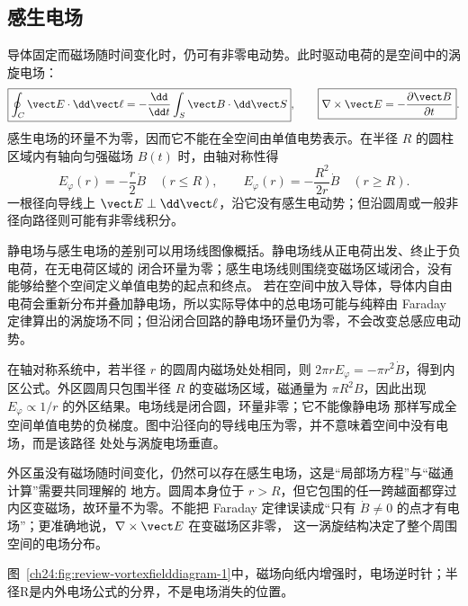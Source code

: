 \subsection{感生电场}

导体固定而磁场随时间变化时，仍可有非零电动势。此时驱动电荷的是空间中的涡旋电场：
\begin{equation}
  \boxed{\oint_C\vect E\cdot\dd\vect\ell
  =-\frac{\dd}{\dd t}\int_S\vect B\cdot\dd\vect S},
  \qquad
  \boxed{\nabla\times\vect E=-\frac{\partial\vect B}{\partial t}}.
\end{equation}
感生电场的环量不为零，因而它不能在全空间由单值电势表示。在半径 $R$ 的圆柱区域内有轴向匀强磁场
$B(t)$ 时，由轴对称性得
\begin{equation}
  \boxed{E_\varphi(r)=-\frac r2\dot B\quad(r\le R)},
  \qquad
  \boxed{E_\varphi(r)=-\frac{R^2}{2r}\dot B\quad(r\ge R)}.
\end{equation}
一根径向导线上 $\vect E\perp\dd\vect\ell$，沿它没有感生电动势；但沿圆周或一般非径向路径则可能有非零线积分。

静电场与感生电场的差别可以用场线图像概括。静电场线从正电荷出发、终止于负电荷，在无电荷区域的
闭合环量为零；感生电场线则围绕变磁场区域闭合，没有能够给整个空间定义单值电势的起点和终点。
若在空间中放入导体，导体内自由电荷会重新分布并叠加静电场，所以实际导体中的总电场可能与纯粹由
Faraday 定律算出的涡旋场不同；但沿闭合回路的静电场环量仍为零，不会改变总感应电动势。

在轴对称系统中，若半径 $r$ 的圆周内磁场处处相同，则
$2\pi rE_\varphi=-\pi r^2\dot B$，得到内区公式。外区圆周只包围半径 $R$ 的变磁场区域，磁通量为
$\pi R^2B$，因此出现 $E_\varphi\propto1/r$ 的外区结果。电场线是闭合圆，环量非零；它不能像静电场
那样写成全空间单值电势的负梯度。图中沿径向的导线电压为零，并不意味着空间中没有电场，而是该路径
处处与涡旋电场垂直。

外区虽没有磁场随时间变化，仍然可以存在感生电场，这是“局部场方程”与“磁通计算”需要共同理解的
地方。圆周本身位于 $r>R$，但它包围的任一跨越面都穿过内区变磁场，故环量不为零。不能把 Faraday
定律误读成“只有 $\dot B\ne0$ 的点才有电场”；更准确地说，$\nabla\times\vect E$ 在变磁场区非零，
这一涡旋结构决定了整个周围空间的电场分布。

图~\ref{ch24:fig:review-vortexfielddiagram-1}中，磁场向纸内增强时，电场逆时针；半径R是内外电场公式的分界，不是电场消失的位置。
\par\noindent\begin{minipage}{\linewidth}
\vortexFieldDiagram
{}\label{ch24:fig:review-vortexfielddiagram-1}
\end{minipage}\par\medskip


